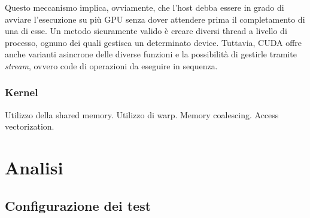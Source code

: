 \documentclass[a4paper]{article}
\begin{document}



Questo meccanismo implica, ovviamente, che l'host debba essere in grado di avviare l'esecuzione su più GPU senza dover attendere prima il completamento di una di esse.
Un metodo sicuramente valido è creare diversi thread a livello di processo, ognuno dei quali gestisca un determinato device.
Tuttavia, CUDA offre anche varianti asincrone delle diverse funzioni e la possibilità di gestirle tramite \textit{stream}, ovvero code di operazioni da eseguire in sequenza.


\subsubsection{Kernel}
Utilizzo della shared memory. Utilizzo di warp. Memory coalescing. Access vectorization.

\section{Analisi}

\subsection{Configurazione dei test}
\end{document}
